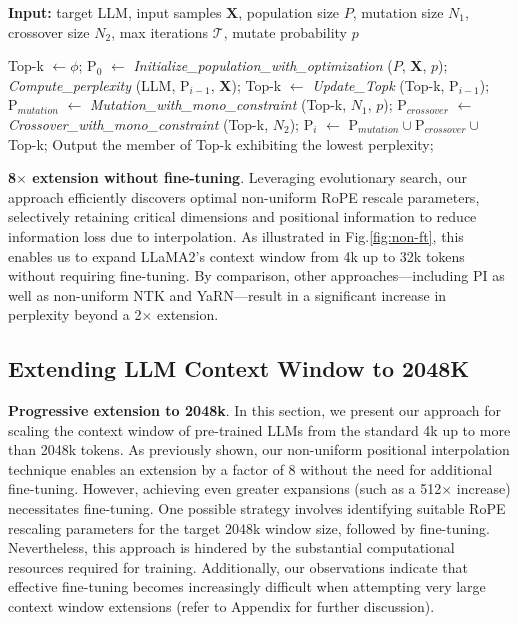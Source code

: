 \begin{algorithm}[t]
	\small
	\caption{The search algorithm}
	\textbf{Input:} target LLM, input samples $\mathbf{X}$,   population size $P$, mutation size $N_1$, crossover size $N_2$, max iterations $\mathcal{T}$, mutate probability $p$\\

	\begin{algorithmic}[1]
		\label{alg:search}
		\STATE Top-k $\leftarrow \phi$;	
		\STATE $\text{P}_0$ $\leftarrow$ \textit{Initialize\_population\_with\_optimization} ($P$, $\mathbf{X}$, $p$); 
		\STATE \textit{Compute\_perplexity} (LLM, $\text{P}_{i-1}$, $\mathbf{X}$);
		\STATE Top-k $\leftarrow$ \textit{Update\_Topk} (Top-k, $\text{P}_{i-1}$);
		\STATE $\text{P}_{mutation}$ $\leftarrow$ \textit{Mutation\_with\_mono\_constraint} (Top-k, $N_1$, $p$); 
		\STATE $\text{P}_{crossover}$ $\leftarrow$ \textit{Crossover\_with\_mono\_constraint} (Top-k, $N_2$);
		\STATE $\text{P}_i$ $\leftarrow$ $\text{P}_{mutation} \cup \text{P}_{crossover} \cup$ Top-k;
		\ENDFOR
		\STATE Output the member of Top-k exhibiting the lowest perplexity;
	\end{algorithmic}
\end{algorithm}

\textbf{8$\times$ extension without fine-tuning}. Leveraging evolutionary search, our approach efficiently discovers optimal non-uniform RoPE rescale parameters, selectively retaining critical dimensions and positional information to reduce information loss due to interpolation. As illustrated in Fig.\ref{fig:non-ft}, this enables us to expand LLaMA2's context window from 4k up to 32k tokens without requiring fine-tuning. By comparison, other approaches—including PI as well as non-uniform NTK and YaRN—result in a significant increase in perplexity beyond a 2$\times$ extension.

\subsection{Extending LLM Context Window to 2048K}
\label{sec:extendto2048k}

\textbf{Progressive extension to 2048k}. In this section, we present our approach for scaling the context window of pre-trained LLMs from the standard 4k up to more than 2048k tokens. As previously shown, our non-uniform positional interpolation technique enables an extension by a factor of 8 without the need for additional fine-tuning. However, achieving even greater expansions (such as a 512$\times$ increase) necessitates fine-tuning. One possible strategy involves identifying suitable RoPE rescaling parameters for the target 2048k window size, followed by fine-tuning. Nevertheless, this approach is hindered by the substantial computational resources required for training. Additionally, our observations indicate that effective fine-tuning becomes increasingly difficult when attempting very large context window extensions (refer to Appendix for further discussion).

